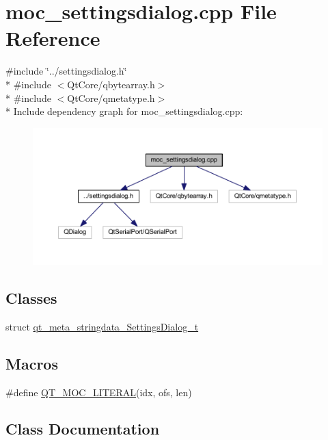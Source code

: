 \hypertarget{a00069}{\section{moc\+\_\+settingsdialog.\+cpp File Reference}
\label{a00069}
}
{\ttfamily \#include \char`\"{}../settingsdialog.\+h\char`\"{}}\\*
{\ttfamily \#include $<$Qt\+Core/qbytearray.\+h$>$}\\*
{\ttfamily \#include $<$Qt\+Core/qmetatype.\+h$>$}\\*
Include dependency graph for moc\+\_\+settingsdialog.\+cpp\+:
\nopagebreak
\begin{figure}[H]
\begin{center}
\leavevmode
\includegraphics[width=350pt]{dd/db3/a00313}
\end{center}
\end{figure}
\subsection*{Classes}
\begin{DoxyCompactItemize}
\item 
struct \hyperlink{a00069_d1/de1/a00213}{qt\+\_\+meta\+\_\+stringdata\+\_\+\+Settings\+Dialog\+\_\+t}
\end{DoxyCompactItemize}
\subsection*{Macros}
\begin{DoxyCompactItemize}
\item 
\#define \hyperlink{a00069_a75bb9482d242cde0a06c9dbdc6b83abe}{Q\+T\+\_\+\+M\+O\+C\+\_\+\+L\+I\+T\+E\+R\+A\+L}(idx, ofs, len)
\end{DoxyCompactItemize}


\subsection{Class Documentation}
\label{d1/de1/a00213}
\hypertarget{a00069_d1/de1/a00213}{}
